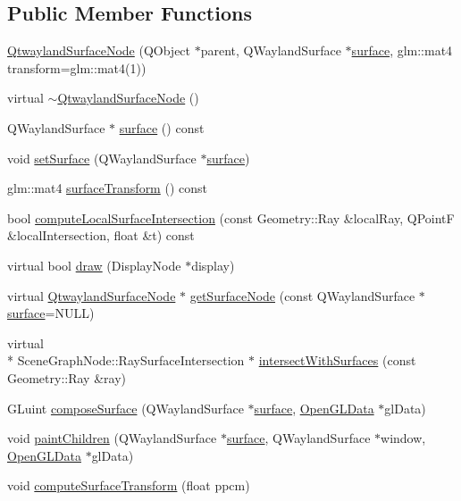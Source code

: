 \subsection*{Public Member Functions}
\begin{DoxyCompactItemize}
\item 
\hyperlink{classQtwaylandSurfaceNode_a582fc9fb7bee6fecc1935c229bc84e72}{Qtwayland\-Surface\-Node} (Q\-Object $\ast$parent, Q\-Wayland\-Surface $\ast$\hyperlink{classQtwaylandSurfaceNode_a8f07c78202a2faa244d9d6c389c03951}{surface}, glm\-::mat4 transform=glm\-::mat4(1))
\item 
virtual \hyperlink{classQtwaylandSurfaceNode_af762332b319b9239e955d4a69b165c14}{$\sim$\-Qtwayland\-Surface\-Node} ()
\item 
Q\-Wayland\-Surface $\ast$ \hyperlink{classQtwaylandSurfaceNode_a8f07c78202a2faa244d9d6c389c03951}{surface} () const 
\item 
void \hyperlink{classQtwaylandSurfaceNode_ace08a2691d01fe10087e9b6997d1523b}{set\-Surface} (Q\-Wayland\-Surface $\ast$\hyperlink{classQtwaylandSurfaceNode_a8f07c78202a2faa244d9d6c389c03951}{surface})
\item 
glm\-::mat4 \hyperlink{classQtwaylandSurfaceNode_a8f88e9c392012d312206da67d6ea81ed}{surface\-Transform} () const 
\item 
bool \hyperlink{classQtwaylandSurfaceNode_a0307e078cfa9bcd6aaad60830ab5b3a6}{compute\-Local\-Surface\-Intersection} (const Geometry\-::\-Ray \&local\-Ray, Q\-Point\-F \&local\-Intersection, float \&t) const 
\item 
virtual bool \hyperlink{classQtwaylandSurfaceNode_a620c58196d857fe5146cfff49c6787fd}{draw} (Display\-Node $\ast$display)
\item 
virtual \hyperlink{classQtwaylandSurfaceNode}{Qtwayland\-Surface\-Node} $\ast$ \hyperlink{classQtwaylandSurfaceNode_a72db2bcd85e26d7f0332175f691a0dfd}{get\-Surface\-Node} (const Q\-Wayland\-Surface $\ast$\hyperlink{classQtwaylandSurfaceNode_a8f07c78202a2faa244d9d6c389c03951}{surface}=N\-U\-L\-L)
\item 
virtual \\*
Scene\-Graph\-Node\-::\-Ray\-Surface\-Intersection $\ast$ \hyperlink{classQtwaylandSurfaceNode_a82a9f9f93675df011cfd350a1857ea8b}{intersect\-With\-Surfaces} (const Geometry\-::\-Ray \&ray)
\item 
G\-Luint \hyperlink{classQtwaylandSurfaceNode_a16ad301303ca42fa9a2ad3d1799cf1a2}{compose\-Surface} (Q\-Wayland\-Surface $\ast$\hyperlink{classQtwaylandSurfaceNode_a8f07c78202a2faa244d9d6c389c03951}{surface}, \hyperlink{classOpenGLData}{Open\-G\-L\-Data} $\ast$gl\-Data)
\item 
void \hyperlink{classQtwaylandSurfaceNode_a0de0e4cbe5312d91334e091160ac4bce}{paint\-Children} (Q\-Wayland\-Surface $\ast$\hyperlink{classQtwaylandSurfaceNode_a8f07c78202a2faa244d9d6c389c03951}{surface}, Q\-Wayland\-Surface $\ast$window, \hyperlink{classOpenGLData}{Open\-G\-L\-Data} $\ast$gl\-Data)
\item 
void \hyperlink{classQtwaylandSurfaceNode_a9917572c6241c4a7593b4c9cd9f8c290}{compute\-Surface\-Transform} (float ppcm)
\end{DoxyCompactItemize}


